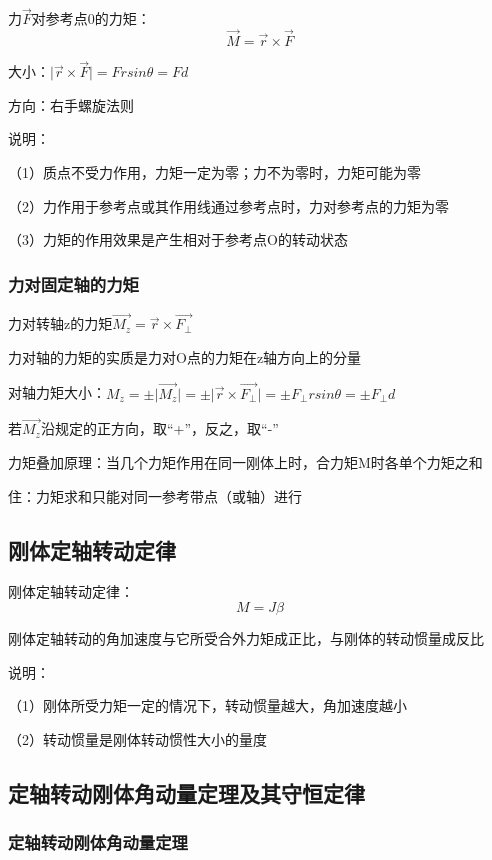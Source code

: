 \documentclass[UTF8]{article}
\begin{document}
    力$\vec{F}$对参考点0的力矩：\[\vec{M} = \vec{r}\times\vec{F}\]

    大小：$\lvert \vec{r}\times\vec{F}\rvert = Frsin\theta = Fd$

    方向：右手螺旋法则

    说明：

    \;\;\;（1）质点不受力作用，力矩一定为零；力不为零时，力矩可能为零

    \;\;（2）力作用于参考点或其作用线通过参考点时，力对参考点的力矩为零

    \;\;（3）力矩的作用效果是产生相对于参考点O的转动状态

\subsubsection{力对固定轴的力矩}

    力对转轴z的力矩$\vec{M_z} = \vec{r}\times\vec{F_{\bot}}$

    力对轴的力矩的实质是力对O点的力矩在z轴方向上的分量

    对轴力矩大小：$M_z = \pm\lvert\vec{M_z}\rvert = \pm\lvert\vec{r}\times\vec{F_{\bot}}\rvert = \pm F_{\bot}rsin\theta = \pm F_{\bot}d$

    若$\vec{M_z}$沿规定的正方向，取“+”，反之，取“-”

    力矩叠加原理：当几个力矩作用在同一刚体上时，合力矩M时各单个力矩之和

    住：力矩求和只能对同一参考带点（或轴）进行

\subsection{刚体定轴转动定律}

    刚体定轴转动定律：\[M = J\beta\]

    刚体定轴转动的角加速度与它所受合外力矩成正比，与刚体的转动惯量成反比

    说明：

    \;\;\;（1）刚体所受力矩一定的情况下，转动惯量越大，角加速度越小

    \;\;（2）转动惯量是刚体转动惯性大小的量度

\subsection{定轴转动刚体角动量定理及其守恒定律}
\subsubsection{定轴转动刚体角动量定理}
\end{document}
